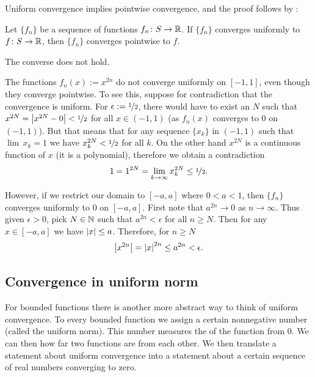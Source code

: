 Uniform convergence
implies pointwise convergence, and the proof follows by
:

\begin{prop}
Let $\{ f_n \}$ be a sequence of functions $f_n \colon S \to {\mathbb{R}}$.
If $\{ f_n \}$ converges
uniformly to $f \colon S \to {\mathbb{R}}$, then $\{ f_n \}$ converges pointwise to $f$.
\end{prop}

The converse does not hold.

\begin{example}
The functions $f_n(x) := x^{2n}$ do not converge uniformly on $[-1,1]$,
even though they converge pointwise.  To see this, suppose for contradiction
that the convergence is uniform.  For $\epsilon := \nicefrac{1}{2}$, there would have
to exist an $N$ such that $x^{2N} = \left\lvert {x^{2N} - 0} \right\rvert < \nicefrac{1}{2}$ for all $x \in
(-1,1)$ (as $f_n(x)$ converges to 0 on $(-1,1)$).  But that means that
for any sequence $\{ x_k \}$ in $(-1,1)$ such that $\lim\, x_k = 1$
we have $x_k^{2N} < \nicefrac{1}{2}$ for all $k$.  On the other hand
$x^{2N}$ is a continuous function of $x$ (it is a polynomial), therefore
we obtain a contradiction
\begin{equation*}
1 = 1^{2N}  = \lim_{k\to\infty} x_k^{2N} \leq \nicefrac{1}{2} .
\end{equation*}

However, if we restrict our domain to $[-a,a]$ where $0 < a < 1$, then
$\{ f_n \}$ converges uniformly to 0 on $[-a,a]$.  First note
that $a^{2n} \to 0$ as $n \to \infty$.  Thus given $\epsilon > 0$,
pick $N \in {\mathbb{N}}$ such that
$a^{2n} < \epsilon$ for all $n \geq N$.  Then for any $x \in [-a,a]$
we have $\left\lvert {x} \right\rvert \leq a$.  Therefore, for $n \geq N$
\begin{equation*}
\left\lvert {x^{2n}} \right\rvert = \left\lvert {x} \right\rvert^{2n} \leq a^{2n} < \epsilon .
\end{equation*}
\end{example}

\subsection{Convergence in uniform norm}

For bounded functions there is another more abstract way to 
think of uniform convergence.  To every bounded function we assign
a certain nonnegative number (called the uniform norm).  This number
measures the  of the function from 0.  We can then
how far two functions are from each other.  We then translate
a statement about uniform convergence into a statement about a certain
sequence of real numbers converging to zero.

